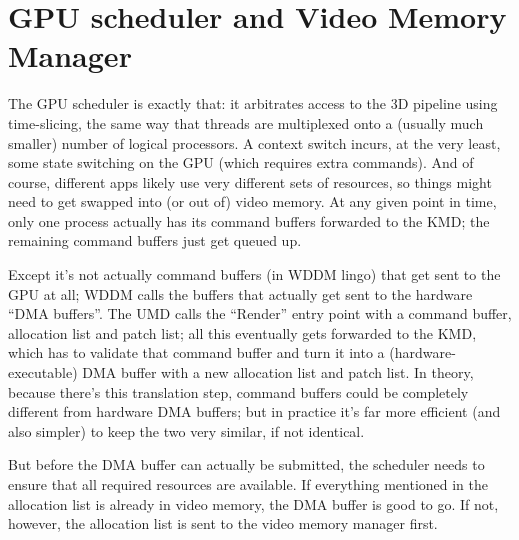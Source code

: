 \section{GPU scheduler and Video Memory Manager}

The GPU scheduler is exactly that: it arbitrates access to the 3D pipeline 
using time-slicing, the same way that threads are multiplexed onto a (usually 
much smaller) number of logical processors. A context switch incurs, at the 
very least, some state switching on the GPU (which requires extra commands).  
And of course, different apps likely use very different sets of resources, so 
things might need to get swapped into (or out of) video memory. At any given 
point in time, only one process actually has its command buffers forwarded to 
the KMD; the remaining command buffers just get queued up.

Except it's not actually command buffers (in WDDM lingo) that get sent to the 
GPU at all; WDDM calls the buffers that actually get sent to the hardware ``DMA 
buffers''. The UMD calls the ``Render'' entry point with a command buffer, 
allocation list and patch list; all this eventually gets forwarded to the KMD, 
which has to validate that command buffer and turn it into 
a (hardware-executable) DMA buffer with a new allocation list and patch list.  
In theory, because there's this translation step, command buffers could be 
completely different from hardware DMA buffers; but in practice it's far more 
efficient (and also simpler) to keep the two very similar, if not identical.

But before the DMA buffer can actually be submitted, the scheduler needs to 
ensure that all required resources are available. If everything mentioned in 
the allocation list is already in video memory, the DMA buffer is good to go.  
If not, however, the allocation list is sent to the video memory manager first.

